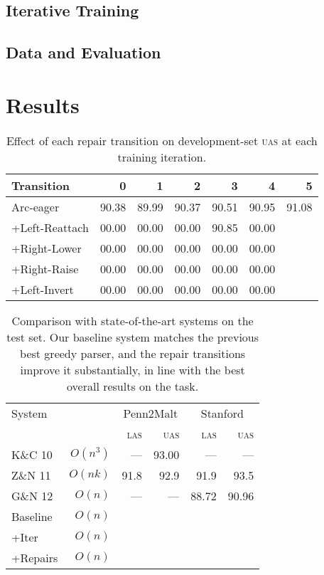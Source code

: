 \documentclass[11pt,letterpaper]{article}
\newcommand{\las}{\textsc{las}\xspace}
\newcommand{\uas}{\textsc{uas}\xspace}
\begin{document}
\subsection{Iterative Training}

\subsection{Data and Evaluation}
\clearpage

\section{Results}
\label{sec:results}

\begin{table}
    \small
    \centering
    \begin{tabular}{l|rrrrrr}
        \hline 
        Transition         & 0      & 1     & 2       & 3     & 4   & 5 \\
        \hline \hline
        Arc-eager          & 90.38  & 89.99 & 90.37 & 90.51 & 90.95 & 91.08\\
        +Left-Reattach     & 00.00  & 00.00 & 00.00 & 90.85 & 00.00 & \\
        +Right-Lower       & 00.00  & 00.00 & 00.00 & 00.00 & 00.00 & \\
        +Right-Raise       & 00.00  & 00.00 & 00.00 & 00.00 & 00.00 & \\
        +Left-Invert       & 00.00  & 00.00 & 00.00 & 00.00 & 00.00 & \\   
        \hline
    \end{tabular}
    \caption{Effect of each repair transition on development-set \uas at 
             each training iteration.\label{tab:feats}}
\end{table}


\begin{table}
    \centering
    \small
    \begin{tabular}{l|r|rr|rr}
        \hline 
System  &          & \multicolumn{2}{c|}{Penn2Malt} & \multicolumn{2}{c}{Stanford} \\
                           &          & \las  & \uas  & \las & \uas \\
        \hline \hline
K\&C 10  & $O(n^3)$ & ---   & 93.00 & ---  & --- \\
Z\&N 11  & $O(nk)$  & 91.8  & 92.9  & 91.9 & 93.5\\
G\&N 12  & $O(n)$   & ---   & ---   & 88.72 & 90.96 \\
        \hline
Baseline & $O(n)$   &   &  &  &  \\
+Iter    & $O(n)$   &       &       &       &       \\
+Repairs & $O(n)$   &  &  &  &  \\
    \end{tabular}
    \caption{Comparison with state-of-the-art systems on the test set.
             Our baseline system matches the previous best greedy parser,
             and the repair transitions improve it substantially, in line with
             the best overall results on the task.\label{tab:feats}}
\end{table}
\end{document}
